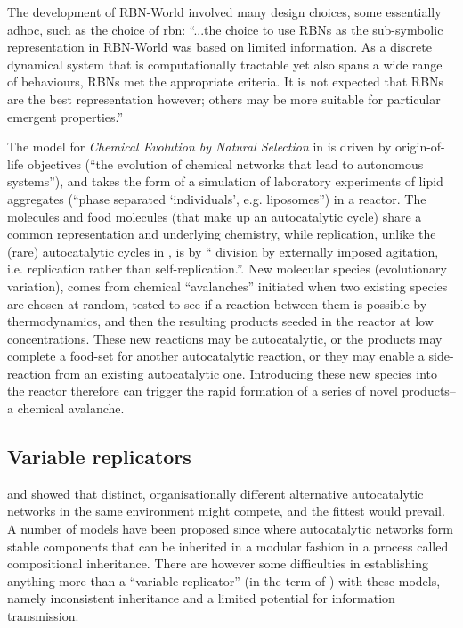The development of RBN-World involved many design choices, some essentially adhoc, such as the choice of \gls{rbn}: ``...the choice to use RBNs as the sub-symbolic representation in RBN-World was based on limited information. As a discrete dynamical system that is computationally tractable yet also spans a wide range of behaviours, RBNs met the appropriate criteria. It is not expected that RBNs are the best representation however; others may be more suitable for particular emergent properties.''

The model for \emph{Chemical Evolution by Natural Selection} in \textcite{Fernando:2008xy,Fernando:2007pf} is driven by origin-of-life objectives (``the evolution of chemical networks that lead to autonomous systems''), and takes the form of a simulation of laboratory experiments of lipid aggregates (``phase separated ‘individuals’, e.g. liposomes'') in a reactor. The molecules and food molecules (that make up an autocatalytic cycle) share a common representation and underlying chemistry, while replication, unlike the (rare) autocatalytic cycles in \textcite{Faulconbridge2011}, is by `` division by externally imposed agitation, i.e. replication rather than self-replication.''. New molecular species (evolutionary variation), comes from chemical ``avalanches'' initiated when two existing species are chosen at random, tested to see if a reaction between them is possible by thermodynamics, and then the resulting products seeded in the reactor at low concentrations. These new reactions may be autocatalytic, or the products may complete a food-set for another autocatalytic reaction, or they may enable a side-reaction from an existing autocatalytic one. Introducing these new species into the reactor therefore can trigger the rapid formation of a series of novel products--a chemical avalanche.

\subsection{Variable replicators}\label{variable-replicators}
\Textcite{Ganti:2003hl} and  \textcite{Eigen1971} showed that distinct, organisationally different alternative autocatalytic networks in the same environment might compete, and the fittest would prevail. A number of models have been proposed since where autocatalytic networks form stable components that can be inherited in a modular fashion in a process called compositional inheritance. There are however some difficulties in establishing anything more than a ``variable replicator'' (in the term of \textcite{Zachar2010}) with these models, namely inconsistent inheritance and a limited potential for information transmission.

